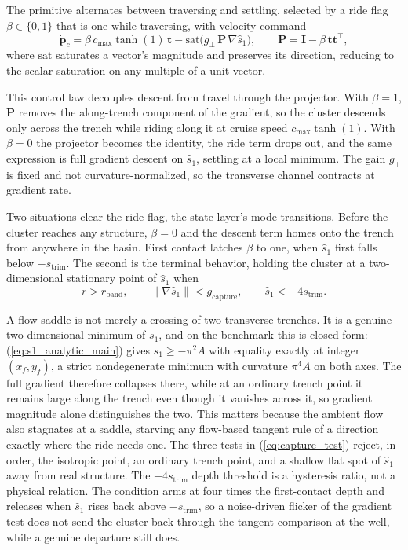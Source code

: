 \documentclass[lettersize,journal]{IEEEtran}
\begin{document}
The primitive alternates between traversing and settling, selected by a
ride flag $\beta \in \{0,1\}$ that is one while traversing, with velocity
command
\begin{equation}
    \dot{\mathbf{p}}_c =
    \beta\,c_{\max}\tanh(1)\,\mathbf{t}
    - \mathrm{sat}\!\bigl(g_\perp\,\mathbf{P}\,\nabla\hat{s}_1\bigr),
    \qquad
    \mathbf{P} = \mathbf{I} - \beta\,\mathbf{t}\mathbf{t}^\top,
\end{equation}
where $\mathrm{sat}$ saturates a vector's magnitude and preserves its
direction, reducing to the scalar saturation on any multiple of a unit
vector.

This control law decouples descent from travel through the projector.
With $\beta = 1$, $\mathbf{P}$ removes the along-trench component of the
gradient, so the cluster descends only across the trench while riding
along it at cruise speed $c_{\max}\tanh(1)$. With $\beta = 0$ the
projector becomes the identity, the ride term drops out, and the same
expression is full gradient descent on $\hat{s}_1$, settling at a
local minimum. The gain $g_\perp$ is fixed and not
curvature-normalized, so the transverse channel contracts at gradient
rate.

Two situations clear the ride flag, the state layer's mode
transitions. Before the cluster reaches any structure, $\beta = 0$
and the descent term homes onto the trench from anywhere in the basin.
First contact latches $\beta$ to one, when $\hat{s}_1$
first falls below $-s_{\mathrm{trim}}$. The second is the
terminal behavior, holding the cluster at a two-dimensional
stationary point of $\hat{s}_1$ when
\begin{equation}
    r > r_{\mathrm{band}}, \qquad
    \lVert\nabla\hat{s}_1\rVert < g_{\mathrm{capture}}, \qquad
    \hat{s}_1 < -4 s_{\mathrm{trim}}.
    \label{eq:capture_test}
\end{equation}

A flow saddle is not merely a crossing of two transverse trenches. It is
a genuine two-dimensional minimum of $s_1$, and on the benchmark this
is closed form: (\ref{eq:s1_analytic_main}) gives
$s_1 \geq -\pi^2 A$ with equality exactly at integer $(x_f, y_f)$, a
strict nondegenerate minimum with curvature $\pi^4 A$ on both axes. The
full gradient therefore collapses there, while at an
ordinary trench point it remains large along the trench even
though it vanishes across it, so gradient magnitude alone distinguishes
the two. This matters because the ambient flow also stagnates at a
saddle, starving any flow-based tangent rule of a direction exactly
where the ride needs one.
The three tests in (\ref{eq:capture_test}) reject, in order, the
isotropic point, an ordinary trench point, and a shallow flat spot of
$\hat{s}_1$ away from real structure. The $-4s_{\mathrm{trim}}$ depth
threshold is a hysteresis ratio, not a physical relation. The
condition arms at four times the first-contact depth and releases when
$\hat{s}_1$ rises back above $-s_{\mathrm{trim}}$, so a noise-driven
flicker of the gradient test does not send the cluster back through the
tangent comparison at the well, while a genuine departure still does.
\end{document}

